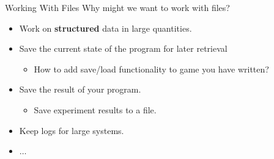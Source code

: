     \begin{frame}{Working With Files}
        \LARGE
        Why might we want to work with files?
        \begin{itemize}
            \pause
            \item Work on \textbf{structured} data in large quantities.
            \pause
            \item Save the current state of the program for later retrieval
            \begin{itemize}
                \Large
                \pause
                \item How to add save/load functionality to game you have written?
            \end{itemize}
            \item Save the result of your program.
            \begin{itemize}
                \Large
                \pause
                \item Save experiment results to a file.
            \end{itemize} 
            \pause
            \item Keep logs for large systems.
            \pause
            \item $\dots$
        \end{itemize}
    \end{frame}

